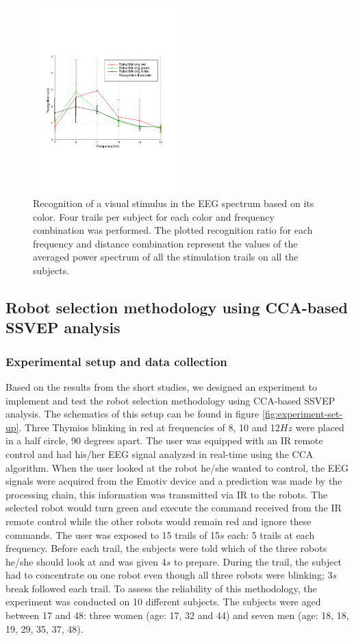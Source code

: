 \documentclass{svmult}
\begin{document}
\begin{figure}
\center
\includegraphics[width=0.5\textwidth]{figures/graph-couleurs.pdf}
\caption{Recognition of a visual stimulus in the EEG spectrum based on its color. Four trails per subject for each color and frequency combination was performed. The plotted recognition ratio for each frequency and distance combination represent the values of the averaged power spectrum of all the stimulation trails on all the subjects.} \label{fig:graph-couleurs}
\end{figure}

\subsection{Robot selection methodology using CCA-based SSVEP analysis}
\subsubsection{Experimental setup and data collection}
Based on the results from the short studies, we designed an experiment to implement and test the robot selection methodology using CCA-based SSVEP analysis. The schematics of this setup can be found in figure \ref{fig:experiment-set-up}. Three Thymios blinking in red at frequencies of 8, 10 and 12$Hz$ were placed in a half circle, 90 degrees apart. The user was equipped with an IR remote control and had his/her EEG signal analyzed in real-time using the CCA algorithm. When the user looked at the robot he/she wanted to control, the EEG signals were acquired from the Emotiv device and a prediction was made by the processing chain, this information was transmitted via IR to the robots. The selected robot would turn green and execute the command received from the IR remote control while the other robots would remain red and ignore these commands. The user was exposed to 15 trails of 15$s$ each: 5 trails at each frequency. Before each trail, the subjects were told which of the three robots he/she should look at and was given 4$s$ to prepare. During the trail, the subject had to concentrate on one robot even though all three robots were blinking; 3$s$ break followed each trail. To assess the reliability of this methodology, the experiment was conducted on 10 different subjects. The subjects were aged between 17 and 48: three women (age: 17, 32 and 44) and seven men (age: 18, 18, 19, 29, 35, 37, 48). 
\end{document}
